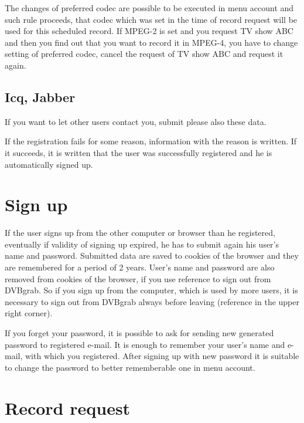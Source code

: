 The changes of preferred codec are possible to be executed in menu account and such rule proceeds, that codec which was set in the time of record request will be used for this scheduled record. If MPEG-2 is set and you request TV show ABC and then you find out that you want to record it in MPEG-4, you have to change setting of preferred codec, cancel the request of TV show ABC and request it again.

\subsection{Icq, Jabber}

If you want to let other users contact you, submit please also these data.

If the registration fails for some reason, information with the reason is written. If it succeeds, it is written that the user was successfully registered and he is automatically signed up.

\section{Sign up}

If the user signs up from the other computer or browser than he registered, eventually if validity of signing up expired, he has to submit again his user's name and password. Submitted data are saved to cookies of the browser and they are remembered for a period of 2 years. User's name and password are also removed from cookies of the browser, if you use reference to sign out from DVBgrab. So if you sign up from the computer, which is used by more users, it is necessary to sign out from DVBgrab always before leaving (reference in the upper right corner).

If you forget your password, it is possible to ask for sending new generated password to registered e-mail. It is enough to remember your user's name and e-mail, with which you registered. After signing up with new password it is suitable to change the password to better rememberable one in menu account.

\section{Record request}

